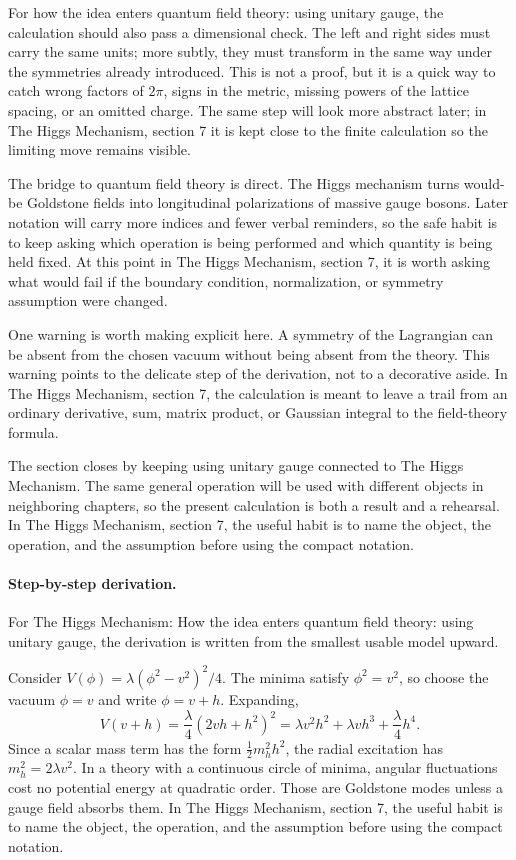 For how the idea enters quantum field theory: using unitary gauge, the calculation should also pass a dimensional check.  The left and right sides must carry the same units; more subtly, they must transform in the same way under the symmetries already introduced.  This is not a proof, but it is a quick way to catch wrong factors of \(2\pi\), signs in the metric, missing powers of the lattice spacing, or an omitted charge.  The same step will look more abstract later; in The Higgs Mechanism, section 7 it is kept close to the finite calculation so the limiting move remains visible.

The bridge to quantum field theory is direct.  The Higgs mechanism turns would-be Goldstone fields into longitudinal polarizations of massive gauge bosons.  Later notation will carry more indices and fewer verbal reminders, so the safe habit is to keep asking which operation is being performed and which quantity is being held fixed.  At this point in The Higgs Mechanism, section 7, it is worth asking what would fail if the boundary condition, normalization, or symmetry assumption were changed.

One warning is worth making explicit here.  A symmetry of the Lagrangian can be absent from the chosen vacuum without being absent from the theory.  This warning points to the delicate step of the derivation, not to a decorative aside.  In The Higgs Mechanism, section 7, the calculation is meant to leave a trail from an ordinary derivative, sum, matrix product, or Gaussian integral to the field-theory formula.

The section closes by keeping using unitary gauge connected to The Higgs Mechanism.  The same general operation will be used with different objects in neighboring chapters, so the present calculation is both a result and a rehearsal.  In The Higgs Mechanism, section 7, the useful habit is to name the object, the operation, and the assumption before using the compact notation.



\paragraph{Step-by-step derivation.}

For The Higgs Mechanism: How the idea enters quantum field theory: using unitary gauge, the derivation is written from the smallest usable model upward.

Consider \(V(\phi)=\lambda(\phi^2-v^2)^2/4\).  The minima satisfy \(\phi^2=v^2\), so choose the vacuum \(\phi=v\) and write \(\phi=v+h\).  Expanding,
\[
  V(v+h)=\frac{\lambda}{4}(2vh+h^2)^2
  =\lambda v^2h^2+\lambda vh^3+\frac{\lambda}{4}h^4.
\]
Since a scalar mass term has the form \(\frac12m_h^2h^2\), the radial excitation has \(m_h^2=2\lambda v^2\).  In a theory with a continuous circle of minima, angular fluctuations cost no potential energy at quadratic order.  Those are Goldstone modes unless a gauge field absorbs them.  In The Higgs Mechanism, section 7, the useful habit is to name the object, the operation, and the assumption before using the compact notation.

